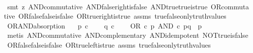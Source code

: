 \begin{isabellebody}
%
\isadelimproof
\ \ %
\endisadelimproof
%
\isatagproof
{}\isamarkupfalse%
\ {\isacharparenleft}{\kern0pt}smt\ {\isacharparenleft}{\kern0pt}z{}{\isacharparenright}{\kern0pt}\ AND{\isacharunderscore}{\kern0pt}commutative\ AND{\isacharunderscore}{\kern0pt}false{\isacharunderscore}{\kern0pt}right{\isacharunderscore}{\kern0pt}is{\isacharunderscore}{\kern0pt}false\ AND{\isacharunderscore}{\kern0pt}true{\isacharunderscore}{\kern0pt}true{\isacharunderscore}{\kern0pt}is{\isacharunderscore}{\kern0pt}true\ OR{\isacharunderscore}{\kern0pt}commutative\ OR{\isacharunderscore}{\kern0pt}false{\isacharunderscore}{\kern0pt}false{\isacharunderscore}{\kern0pt}is{\isacharunderscore}{\kern0pt}false\ OR{\isacharunderscore}{\kern0pt}true{\isacharunderscore}{\kern0pt}right{\isacharunderscore}{\kern0pt}is{\isacharunderscore}{\kern0pt}true\ assms\ true{\isacharunderscore}{\kern0pt}false{\isacharunderscore}{\kern0pt}only{\isacharunderscore}{\kern0pt}truth{\isacharunderscore}{\kern0pt}values{\isacharparenright}{\kern0pt}%
\endisatagproof
{\isafoldproof}%
%
\isadelimproof
\isanewline
%
\endisadelimproof
\isanewline
{}\isamarkupfalse%
\ OR{\isacharunderscore}{\kern0pt}AND{\isacharunderscore}{\kern0pt}absorption{\isacharcolon}{\kern0pt}\isanewline
\ \ \ {\isachardoublequoteopen}p\ {\isasymin}\isactrlsub c\ {\isasymOmega}{\isachardoublequoteclose}\isanewline
\ \ \ {\isachardoublequoteopen}q\ {\isasymin}\isactrlsub c\ {\isasymOmega}{\isachardoublequoteclose}\isanewline
\ \ \ {\isachardoublequoteopen}OR\ {\isasymcirc}\isactrlsub c\ {\isasymlangle}p{\isacharcomma}{\kern0pt}\ AND\ {\isasymcirc}\isactrlsub c\ {\isasymlangle}p{\isacharcomma}{\kern0pt}q{\isasymrangle}{\isasymrangle}\ {\isacharequal}{\kern0pt}\ p{\isachardoublequoteclose}\isanewline
%
\isadelimproof
\ \ %
\endisadelimproof
%
\isatagproof
{}\isamarkupfalse%
\ {\isacharparenleft}{\kern0pt}metis\ AND{\isacharunderscore}{\kern0pt}commutative\ AND{\isacharunderscore}{\kern0pt}complementary\ AND{\isacharunderscore}{\kern0pt}idempotent\ NOT{\isacharunderscore}{\kern0pt}true{\isacharunderscore}{\kern0pt}is{\isacharunderscore}{\kern0pt}false\ OR{\isacharunderscore}{\kern0pt}false{\isacharunderscore}{\kern0pt}false{\isacharunderscore}{\kern0pt}is{\isacharunderscore}{\kern0pt}false\ OR{\isacharunderscore}{\kern0pt}true{\isacharunderscore}{\kern0pt}left{\isacharunderscore}{\kern0pt}is{\isacharunderscore}{\kern0pt}true\ assms\ true{\isacharunderscore}{\kern0pt}false{\isacharunderscore}{\kern0pt}only{\isacharunderscore}{\kern0pt}truth{\isacharunderscore}{\kern0pt}values{\isacharparenright}{\kern0pt}%

\end{isabellebody}
